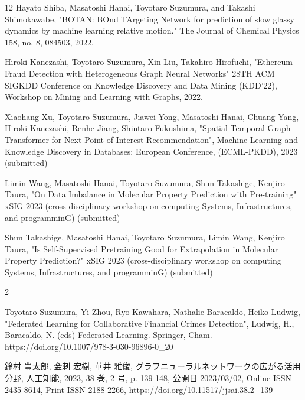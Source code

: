 \begin{査読付}{12}
Hayato Shiba, Masatoshi Hanai, Toyotaro Suzumura, and Takashi Shimokawabe, "BOTAN: BOnd TArgeting Network for prediction of slow glassy dynamics by machine learning relative motion." The Journal of Chemical Physics 158, no. 8, 084503, 2022.

Hiroki Kanezashi, Toyotaro Suzumura, Xin Liu, Takahiro Hirofuchi,
"Ethereum Fraud Detection with Heterogeneous Graph Neural Networks"
28TH ACM SIGKDD Conference on Knowledge Discovery and Data Mining (KDD'22), Workshop on Mining and Learning with Graphs, 2022.

Xiaohang Xu, Toyotaro Suzumura, Jiawei Yong, Masatoshi Hanai, Chuang Yang, Hiroki Kanezashi, Renhe Jiang, Shintaro Fukushima, "Spatial-Temporal Graph Transformer for Next Point-of-Interest Recommendation", Machine Learning and Knowledge Discovery in Databases: European Conference, (ECML-PKDD), 2023 (submitted)


Limin Wang, Masatoshi Hanai, Toyotaro Suzumura, Shun Takashige, Kenjiro Taura, "On Data Imbalance in Molecular Property Prediction with Pre-training" xSIG 2023 (cross-disciplinary workshop on computing Systems, Infrastructures, and programminG)  (submitted)

Shun Takashige, Masatoshi Hanai, Toyotaro Suzumura, Limin Wang, Kenjiro Taura, "Is Self-Supervised Pretraining Good for Extrapolation in Molecular Property Prediction?" xSIG 2023 (cross-disciplinary workshop on computing Systems, Infrastructures, and programminG) (submitted)



\end{査読付}

\begin{著書}{2}

Toyotaro Suzumura, Yi Zhou, Ryo Kawahara, Nathalie Baracaldo, Heiko Ludwig,
"Federated Learning for Collaborative Financial Crimes Detection",
Ludwig, H., Baracaldo, N. (eds) Federated Learning. Springer, Cham. https://doi.org/10.1007/978-3-030-96896-0\_20

鈴村 豊太郎, 金刺 宏樹, 華井 雅俊, グラフニューラルネットワークの広がる活用分野, 人工知能, 2023, 38 巻, 2 号, p. 139-148, 公開日 2023/03/02, Online ISSN 2435-8614, Print ISSN 2188-2266, https://doi.org/10.11517/jjsai.38.2\_139

\end{著書}


